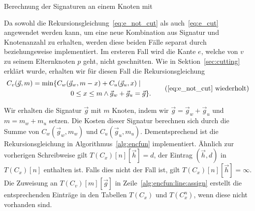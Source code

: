 \begin{algorithm}
    \caption{Berechnung der Signaturen an einem Knoten mit \canfun{}}\label{alg:canfun}
    \begin{algorithmic}[1]
                        \State {}
                        \State {}
                    \EndFor
                \EndFor
            \EndFor
        \EndFor
        \EndFunction
    \end{algorithmic}
\end{algorithm}

\newcommand{\encfun}{\textproc{edge\_not\_cut}}
\newcommand{\ecfun}{\textproc{edge\_cut}}

Da sowohl die Rekursionsgleichung~\eqref{eq:e_not_cut} als auch~\eqref{eq:e_cut} angewendet werden kann, um eine neue Kombination aus Signatur und Knotenanzahl zu erhalten, werden diese beiden Fälle separat durch \encfun{} beziehungsweise \ecfun{} implementiert.
Im ersteren Fall wird die Kante $e$, welche von $v$ zu seinem Elternknoten $p$ geht, nicht geschnitten.
Wie in Sektion~\ref{sec:cutting} erklärt wurde, erhalten wir für diesen Fall die Rekursionsgleichung
\begin{equation*}
    \begin{aligned}
        C_v(\vec{g}, m) = \min \{ & C_w(\vec{g}_w, m - x) + C_u(\vec{g}_u, x) \mid \\
        & \qquad 0 \leq x \leq m \land \vec{g}_w + \vec{g}_u = \vec{g} \}.
    \end{aligned}
    \tag{\ref{eq:e_not_cut} wiederholt}
\end{equation*}

Wir erhalten die Signatur $\vec{g}$ mit $m$ Knoten, indem wir $\vec{g} = \vec{g}_w + \vec{g}_u$ und $m = m_w + m_u$ setzen.
Die Kosten dieser Signatur berechnen sich durch die Summe von $C_w(\vec{g}_w, m_w)$ und $C_u(\vec{g}_u, m_u)$.
Dementsprechend ist die Rekursionsgleichung in Algorithmus~\ref{alg:encfun} implementiert.
Ähnlich zur vorherigen Schreibweise gilt $T(C_x)[n][\vec{h}] = d$, der Eintrag $(\vec{h}, d)$ in $T(C_x)[n]$ enthalten ist.
Falls dies nicht der Fall ist, gilt $T(C_x)[n][\vec{h}] = \infty$.
Die Zuweisung an $T(C_v)[m][\vec{g}]$ in Zeile~\ref{alg:encfun:line:assign} erstellt die entsprechenden Einträge in den Tabellen $T(C_x)$ und $T(C_x^n)$, wenn diese nicht vorhanden sind.

